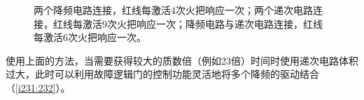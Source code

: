 \begin{figure}[!ht]
\begin{center}
\qquad
{}
\qquad
{}
\end{center}
\caption{\protect{}两个降频电路连接，红线每激活4次火把响应一次；\protect{}两个递次电路连接，红线每激活9次火把响应一次；\protect{}降频电路与递次电路连接，红线每激活6次火把响应一次。}
\label{i223:228}
\end{figure}

使用上面的方法，当需要获得较大的质数倍（例如23倍）时间时使用递次电路体积过大，此时可以利用故障逻辑门的控制功能灵活地将多个降频的驱动结合（\autoref{i231:232}）。

